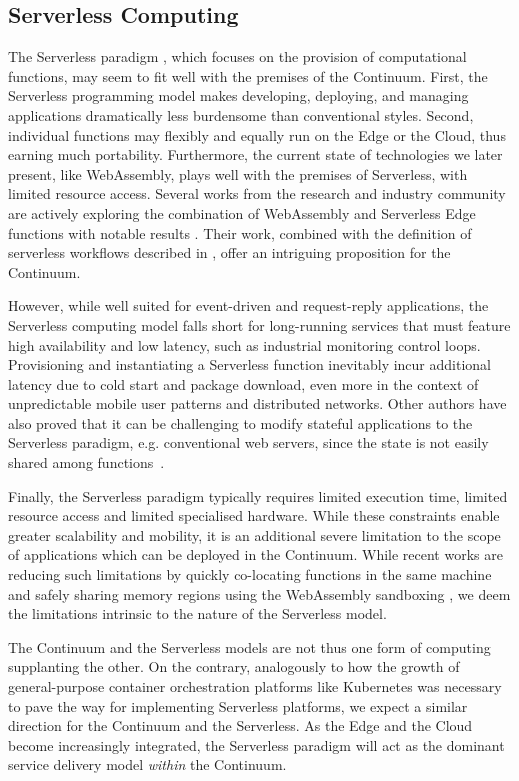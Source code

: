 \subsection{Serverless Computing}

The Serverless paradigm \cite{shafiei2022serverless}, which focuses on the provision of computational functions, may seem to fit well with the premises of the Continuum. First, the Serverless programming model makes developing, deploying, and managing applications dramatically less burdensome than conventional styles.
Second, individual functions may flexibly and equally run on the Edge or the Cloud, thus earning much portability. Furthermore, the current state of technologies we later present, like WebAssembly, plays well with the premises of Serverless, with limited resource access. Several works from the research and industry community are actively exploring the combination of WebAssembly and Serverless Edge functions with notable results \cite{gadepalli2020sledge, hall2019execution, shillaker2020faasm}. Their work, combined with the definition of serverless workflows described in \cite{risco2021serverless}, offer an intriguing proposition for the Continuum.

However, while well suited for event-driven and request-reply applications, the Serverless computing model falls short for long-running services that must feature high availability and low latency, such as industrial monitoring control loops. Provisioning and instantiating a Serverless function inevitably incur additional latency due to cold start and package download, even more in the context of unpredictable mobile user patterns and distributed networks. Other authors have also proved that it can be challenging to modify stateful applications to the Serverless paradigm, e.g. conventional web servers, since the state is not easily shared among functions~\cite{MALAWSKI2020502}.

Finally, the Serverless paradigm typically requires limited execution time, limited resource access and limited specialised hardware. While these constraints enable greater scalability and mobility, it is an additional severe limitation to the scope of applications which can be deployed in the Continuum. While recent works are reducing such limitations by quickly co-locating functions in the same machine and safely sharing memory regions using the WebAssembly sandboxing \cite{shillaker2020faasm}, we deem the limitations intrinsic to the nature of the Serverless model. 

The Continuum and the Serverless models are not thus one form of computing supplanting the other. On the contrary, analogously to how the growth of general-purpose container orchestration platforms like Kubernetes was necessary to pave the way for implementing Serverless platforms, we expect a similar direction for the Continuum and the Serverless. As the Edge and the Cloud become increasingly integrated, the Serverless paradigm will act as the dominant service delivery model \textit{within} the Continuum.

